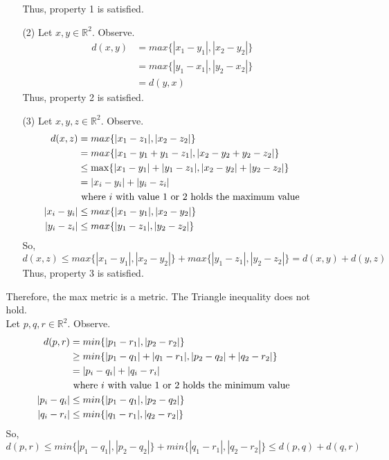 \documentclass[12pt]{article}
\newcommand{\R}{\mathbb{R}}
\begin{document}
\begin{enumerate}
\begin{enumerate}
\begin{enumerate}
			Thus, property 1 is satisfied.
			\item[(2)] Let $ x,y\in \R^2 $. Observe.
			\begin{align*}
			d(x,y) &= max\{|x_1-y_1|,|x_2-y_2|\}\\
			&= max\{|y_1-x_1|,|y_2-x_2|\}\\
			&= d(y,x)
			\end{align*}
			Thus, property 2 is satisfied.
			\item[(3)] Let $ x,y,z \in \R^2 $. Observe.
			\begin{align*}
			d(x,z)  &= max\{|x_1-z_1|,|x_2-z_2|\}\\
					&= max\{|x_1-y_1+y_1-z_1|,|x_2-y_2+y_2-z_2|\}\\
					&\leq \max\{|x_1-y_1|+|y_1-z_1|,|x_2-y_2|+|y_2-z_2|\}\\
					&= |x_i-y_i|+|y_i-z_i| \\
					&\text{ where $ i $ with value 1 or 2 holds the maximum value}\\
			|x_i-y_i|&\leq max\{|x_1-y_1|,|x_2-y_2|\}\\
			|y_i-z_i|&\leq max\{|y_1-z_1|,|y_2-z_2|\}
			\end{align*}
			So, 
				\[d(x,z) \leq max\{|x_1-y_1|,|x_2-y_2|\} + max\{|y_1-z_1|,|y_2-z_2|\}=d(x,y)+d(y,z)\]
			Thus, property 3 is satisfied.
		\end{enumerate}	
		Therefore, the max metric is a metric.
		The Triangle inequality does not hold.\\
		Let $ p,q,r \in \R^2 $. Observe.
		\begin{align*}
			d(p,r) &= min\{|p_1-r_1|,|p_2-r_2|\}\\
				   &\geq min\{|p_1-q_1|+|q_1-r_1|,|p_2-q_2|+|q_2-r_2|\}\\
				   &= |p_i-q_i|+|q_i-r_i|\\
				   &\text{ where $ i $ with value 1 or 2 holds the minimum value}\\
				    |p_i-q_i| &\leq min\{|p_1-q_1|,|p_2-q_2|\}\\
				    |q_i-r_i| &\leq min\{|q_1-r_1|,|q_2-r_2|\}
		\end{align*}
		So, 
			\[d(p,r) \leq min\{|p_1-q_1|,|p_2-q_2|\} + min\{|q_1-r_1|,|q_2-r_2|\}\leq d(p,q)+d(q,r)\]
	\end{enumerate}

\end{enumerate}
\end{document}
